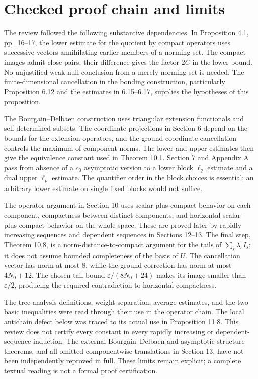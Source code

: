 \documentclass[10pt]{article}
\begin{document}
\section*{Checked proof chain and limits}
The review followed the following substantive dependencies. In Proposition 4.1, pp. 16–17, the lower estimate for the quotient by compact operators uses successive vectors annihilating earlier members of a norming set. The compact images admit close pairs; their difference gives the factor \(2C\) in the lower bound. No unjustified weak-null conclusion from a merely norming set is needed. The finite-dimensional cancellation in the bonding construction, particularly Proposition 6.12 and the estimates in 6.15–6.17, supplies the hypotheses of this proposition.\par
The Bourgain–Delbaen construction uses triangular extension functionals and self-determined subsets. The coordinate projections in Section 6 depend on the bounds for the extension operators, and the ground-coordinate cancellation controls the maximum of component norms. The lower and upper estimates then give the equivalence constant used in Theorem 10.1. Section 7 and Appendix A pass from absence of a \(c_0\) asymptotic version to a lower block \(\ell_q\) estimate and a dual upper \(\ell_p\) estimate. The quantifier order in the block choices is essential; an arbitrary lower estimate on single fixed blocks would not suffice.\par
The operator argument in Section 10 uses scalar-plus-compact behavior on each component, compactness between distinct components, and horizontal scalar-plus-compact behavior on the whole space. These are proved later by rapidly increasing sequences and dependent sequences in Sections 12–13. The final step, Theorem 10.8, is a norm-distance-to-compact argument for the tails of \(\sum_s\lambda_s I_s\); it does not assume bounded completeness of the basis of \(U\). The cancellation vector has norm at most \(8\), while the ground correction has norm at most \(4N_0+12\). The chosen tail bound \(\varepsilon/(8N_0+24)\) makes its image smaller than \(\varepsilon/2\), producing the required contradiction to horizontal compactness.\par
The tree-analysis definitions, weight separation, average estimates, and the two basic inequalities were read through their use in the operator chain. The local antichain defect below was traced to its actual use in Proposition 11.8. This review does not certify every constant in every rapidly increasing or dependent-sequence induction. The external Bourgain–Delbaen and asymptotic-structure theorems, and all omitted componentwise translations in Section 13, have not been independently reproved in full. These limits remain explicit; a complete textual reading is not a formal proof certification.\par
\end{document}
